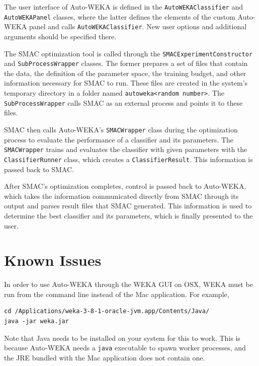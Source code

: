 \documentclass{article}
\begin{document}
The user interface of Auto-WEKA is defined in the \verb=AutoWEKAClassifier= and
\verb=AutoWEKAPanel= classes, where the latter defines the elements of the
custom Auto-WEKA panel and calls \verb=AutoWEKAClassifier=. New user options and
additional arguments should be specified there.

The SMAC optimization tool is called through the
\verb=SMACExperimentConstructor= and \verb=SubProcessWrapper= classes. The
former prepares a set of files that contain the data, the definition of the
parameter space, the training budget, and other information necessary for SMAC
to run. These files are created in the system's temporary directory in a folder
named \verb=autoweka<random number>=. The \verb=SubProcessWrapper= calls SMAC as
an external process and points it to these files.

SMAC then calls Auto-WEKA's \verb=SMACWrapper= class during the optimization
process to evaluate the performance of a classifier and its parameters. The
\verb=SMACWrapper= trains and evaluates the classifier with given parameters
with the \verb=ClassifierRunner= class, which creates a \verb=ClassifierResult=.
This information is passed back to SMAC.

After SMAC's optimization completes, control is passed back to Auto-WEKA, which
takes the information communicated directly from SMAC through its output and
parses result files that SMAC generated. This information is used to determine
the best classifier and its parameters, which is finally presented to the user.

\section{Known Issues}

In order to use Auto-WEKA through the WEKA GUI on OSX, WEKA must be run from the
command line instead of the Mac application. For example,

\begin{verbatim}
cd /Applications/weka-3-8-1-oracle-jvm.app/Contents/Java/
java -jar weka.jar
\end{verbatim}

Note that Java needs to be installed on your system for this to work. This is because
Auto-WEKA needs a \verb=java= executable to spawn worker processes, and the JRE bundled
with the Mac application does not contain one.

\appendix


\end{document}
